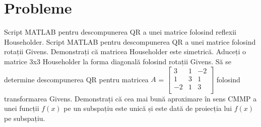 \documentclass{exam}
\begin{document}
\section{Probleme}

\begin{questions}
	\boxedpoints
	\pointsinmargin

	\question Script MATLAB pentru descompunerea QR a unei matrice folosind reflexii Householder.
	\question Script MATLAB pentru descompunerea QR a unei matrice folosind rotații Givens.
	\question Demonstrați că matricea Householder este simetrică.
	\question Aduceți o matrice 3x3 Householder la forma diagonală folosind
	rotații Givens.
	\question Să se determine descompunerea QR pentru matricea
	$A$ = $\begin{bmatrix}
			3  & 1 & -2 \\
			1  & 3 & 1  \\
			-2 & 1 & 3  \\
		\end{bmatrix}$ folosind transformarea Givens.
	\question Demonstrați că cea mai bună aproximare în sens CMMP a unei funcții
	$f(x)$ pe un subspațiu este unică și este dată de proiecția lui $f(x)$ pe
	subspațiu.
\end{questions}



\end{document}
